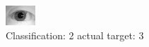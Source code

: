 \begin{figure}[h!]
\begin{center}
\includegraphics[width=0.60\columnwidth]{figures/ID1064_class_2_target_3.png}
\end{center}
\caption{ Classification: 2 actual target: 3}
\label{fig:ID1064_class_2_target_3}
\end{figure}
